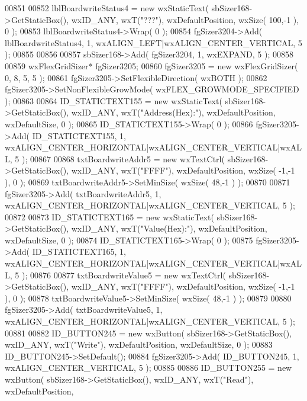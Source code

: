 \begin{DoxyCode}
00851     
00852     lblBoardwriteStatus4 = \textcolor{keyword}{new} wxStaticText( sbSizer168->GetStaticBox(), wxID\_ANY, wxT(\textcolor{stringliteral}{"???"}), 
      wxDefaultPosition, wxSize( 100,-1 ), 0 );
00853     lblBoardwriteStatus4->Wrap( 0 );
00854     fgSizer3204->Add( lblBoardwriteStatus4, 1, wxALIGN\_LEFT|wxALIGN\_CENTER\_VERTICAL, 5 );
00855     
00856     
00857     sbSizer168->Add( fgSizer3204, 1, wxEXPAND, 5 );
00858     
00859     wxFlexGridSizer* fgSizer3205;
00860     fgSizer3205 = \textcolor{keyword}{new} wxFlexGridSizer( 0, 8, 5, 5 );
00861     fgSizer3205->SetFlexibleDirection( wxBOTH );
00862     fgSizer3205->SetNonFlexibleGrowMode( wxFLEX\_GROWMODE\_SPECIFIED );
00863     
00864     ID_STATICTEXT155 = \textcolor{keyword}{new} wxStaticText( sbSizer168->GetStaticBox(), wxID\_ANY, wxT(\textcolor{stringliteral}{"Address(Hex):"}), 
      wxDefaultPosition, wxDefaultSize, 0 );
00865     ID_STATICTEXT155->Wrap( 0 );
00866     fgSizer3205->Add( ID_STATICTEXT155, 1, wxALIGN\_CENTER\_HORIZONTAL|wxALIGN\_CENTER\_VERTICAL|wxALL, 5 );
00867     
00868     txtBoardwriteAddr5 = \textcolor{keyword}{new} wxTextCtrl( sbSizer168->GetStaticBox(), wxID\_ANY, wxT(\textcolor{stringliteral}{"FFFF"}), 
      wxDefaultPosition, wxSize( -1,-1 ), 0 );
00869     txtBoardwriteAddr5->SetMinSize( wxSize( 48,-1 ) );
00870     
00871     fgSizer3205->Add( txtBoardwriteAddr5, 1, wxALIGN\_CENTER\_HORIZONTAL|wxALIGN\_CENTER\_VERTICAL, 5 );
00872     
00873     ID_STATICTEXT165 = \textcolor{keyword}{new} wxStaticText( sbSizer168->GetStaticBox(), wxID\_ANY, wxT(\textcolor{stringliteral}{"Value(Hex):"}), 
      wxDefaultPosition, wxDefaultSize, 0 );
00874     ID_STATICTEXT165->Wrap( 0 );
00875     fgSizer3205->Add( ID_STATICTEXT165, 1, wxALIGN\_CENTER\_HORIZONTAL|wxALIGN\_CENTER\_VERTICAL|wxALL, 5 );
00876     
00877     txtBoardwriteValue5 = \textcolor{keyword}{new} wxTextCtrl( sbSizer168->GetStaticBox(), wxID\_ANY, wxT(\textcolor{stringliteral}{"FFFF"}), 
      wxDefaultPosition, wxSize( -1,-1 ), 0 );
00878     txtBoardwriteValue5->SetMinSize( wxSize( 48,-1 ) );
00879     
00880     fgSizer3205->Add( txtBoardwriteValue5, 1, wxALIGN\_CENTER\_HORIZONTAL|wxALIGN\_CENTER\_VERTICAL, 5 );
00881     
00882     ID_BUTTON245 = \textcolor{keyword}{new} wxButton( sbSizer168->GetStaticBox(), wxID\_ANY, wxT(\textcolor{stringliteral}{"Write"}), wxDefaultPosition, 
      wxDefaultSize, 0 );
00883     ID_BUTTON245->SetDefault(); 
00884     fgSizer3205->Add( ID_BUTTON245, 1, wxALIGN\_CENTER\_VERTICAL, 5 );
00885     
00886     ID_BUTTON255 = \textcolor{keyword}{new} wxButton( sbSizer168->GetStaticBox(), wxID\_ANY, wxT(\textcolor{stringliteral}{"Read"}), wxDefaultPosition, 

\end{DoxyCode}
